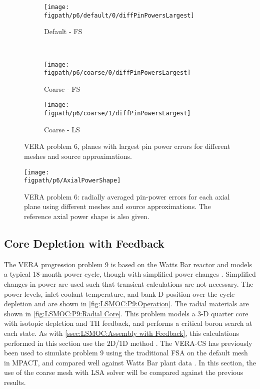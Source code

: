 {{{      \begin{figure}[htbp]
        \centering
        \begin{subfigure}[t]{0.49\textwidth}
          \centering
          \texttt{[image: \\figpath/p6/default/0/diffPinPowersLargest]}
          \caption{Default - FS\label{fig:LSMOC:P6:Default-FS:LargestPinPowerErrors}}
        \end{subfigure}%
        ~
        \begin{subfigure}[t]{0.49\textwidth}
          \centering
          \texttt{[image: \\figpath/p6/coarse/0/diffPinPowersLargest]}
          \caption{Coarse - FS\label{fig:LSMOC:P6:Coarse-FS:LargestPinPowerErrors}}
        \end{subfigure}
        \begin{subfigure}[t]{0.49\textwidth}
          \centering
          \texttt{[image: \\figpath/p6/coarse/1/diffPinPowersLargest]}
          \caption{Coarse - LS\label{fig:LSMOC:P6:Coarse-LS:LargestPinPowerErrors}}
        \end{subfigure}
        \caption{VERA problem 6, planes with largest pin power errors for different meshes and source approximations.}
        \label{figs:LSMOC:P6:LargestPinPowerErrors}
      \end{figure}

      \begin{figure}[htbp]
        \centering
        \texttt{[image: \\figpath/p6/AxialPowerShape]}
        \caption{VERA problem 6: radially averaged pin-power errors for each axial plane using different meshes and source approximations.
                 The reference axial power shape is also given. \label{fig:LSMOC:P6:AxialPowerShape}}
      \end{figure}
    }

    \subsection{Core Depletion with Feedback}{\label{ssec:LSMOC:Core Depletion with Feedback}
      The \ac{VERA} progression problem 9 is based on the Watts Bar reactor and models a typical 18-month power cycle, though with simplified power changes \cite{VERA,VERAProblems}.
      Simplified changes in power are used such that transient calculations are not necessary.
      The power levels, inlet coolant temperature, and bank D position over the cycle depletion and are shown in \cref{fig:LSMOC:P9:Operation}.
      The radial materials are shown in \cref{fig:LSMOC:P9:Radial Core}.
      This problem models a 3-D quarter core with isotopic depletion and \ac{TH} feedback, and performs a critical boron search at each state.
      As with \cref{ssec:LSMOC:Assembly with Feedback}, this calculations performed in this section use the 2D/1D method \cite{Collins2016,VERA}.
      The \ac{VERA-CS} has previously been used to simulate problem 9 using the traditional \ac{FSA} on the default mesh in MPACT, and compared well against Watts Bar plant data \cite{VERA}.
      In this section, the use of the coarse mesh with \ac{LSA} solver will be compared against the previous results.

}}}

